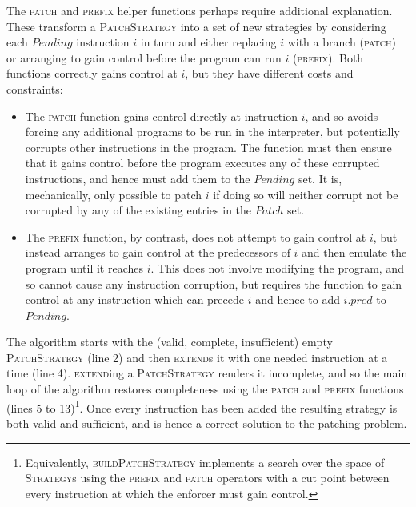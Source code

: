 The \textsc{patch} and \textsc{prefix} helper functions perhaps
require additional explanation.  These transform a
\textsc{PatchStrategy} into a set of new strategies by considering
each $\mathit{Pending}$ instruction $i$ in turn and either replacing
$i$ with a branch (\textsc{patch}) or arranging to gain control before
the program can run $i$ (\textsc{prefix}).  Both functions correctly
gains control at $i$, but they have different costs and constraints:
\begin{itemize}
\item The \textsc{patch} function gains control directly at
  instruction $i$, and so avoids forcing any additional programs to be
  run in the interpreter, but potentially corrupts other instructions
  in the program.  The function must then ensure that it gains control
  before the program executes any of these corrupted instructions, and
  hence must add them to the $\mathit{Pending}$ set.  It is,
  mechanically, only possible to patch $i$ if doing so will neither
  corrupt not be corrupted by any of the existing entries in the
  $\mathit{Patch}$ set.
\item The \textsc{prefix} function, by contrast, does not attempt to
  gain control at $i$, but instead arranges to gain control at the
  predecessors of $i$ and then emulate the program until it reaches
  $i$.  This does not involve modifying the program, and so cannot
  cause any instruction corruption, but requires the function to gain
  control at any instruction which can precede $i$ and hence to add
  $i.\mathit{pred}$ to $\mathit{Pending}$.
\end{itemize}
The algorithm starts with the (valid, complete, insufficient) empty
\textsc{PatchStrategy} (line 2) and then \textsc{extend}s it with one
needed instruction at a time (line 4).  \textsc{extend}ing a
\textsc{PatchStrategy} renders it incomplete, and so the main loop of
the algorithm restores completeness using the \textsc{patch} and
\textsc{prefix} functions (lines 5 to 13)\footnote{Equivalently,
  \textsc{buildPatchStrategy} implements a search over the space of
  \textsc{Strategy}s using the \textsc{prefix} and \textsc{patch}
  operators with a cut point between every instruction at which the
  enforcer must gain control.}.  Once every instruction has been added
the resulting strategy is both valid and sufficient, and is hence a
correct solution to the patching problem.
